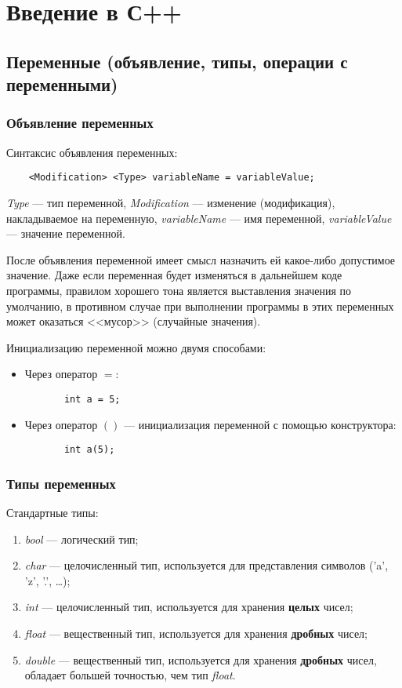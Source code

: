 \section{Введение в С++}

\subsection{Переменные (объявление, типы, операции с переменными)}

\subsubsection{Объявление переменных}
Синтаксис объявления переменных:
\lstset{style=CPlusPlus}
\begin{lstlisting}
    <Modification> <Type> variableName = variableValue;
\end{lstlisting}

\textit{Type} --- тип переменной, \textit{Modification} --- изменение (модификация), накладываемое на переменную, \textit{variableName} --- имя переменной, \textit{variableValue} --- значение переменной.

После объявления переменной имеет смысл назначить ей какое-либо допустимое значение. Даже если переменная будет изменяться в дальнейшем коде программы, правилом хорошего тона является выставления значения по умолчанию, в противном случае при выполнении программы в этих переменных может оказаться <<мусор>> (случайные значения).

Инициализацию переменной можно двумя способами:
\begin{itemize}
    \item Через оператор $=$:
    \begin{lstlisting}
       int a = 5;
    \end{lstlisting}
    \item Через оператор $()$ --- инициализация переменной с помощью конструктора:
    \lstset{style=CPlusPlus}
    \begin{lstlisting}
       int a(5);
    \end{lstlisting}
\end{itemize}

\subsubsection{Типы переменных}
Стандартные типы:
\begin{enumerate}
    \item \textit{bool} --- логический тип;
    \item \textit{char} --- целочисленный тип, используется для представления символов ('a', 'z', '.', \ldots);
    \item \textit{int} --- целочисленный тип, используется для хранения \textbf{целых} чисел;
    \item \textit{float} --- вещественный тип, используется для хранения \textbf{дробных} чисел;
    \item \textit{double} --- вещественный тип, используется для хранения \textbf{дробных} чисел, обладает большей точностью, чем тип \textit{float}.
\end{enumerate}

